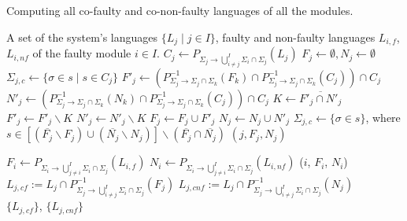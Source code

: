 \documentclass[a4paper, 10pt, conference]{ieeeconf}
\begin{document}
\begin{algorithm} Computing all co-faulty and co-non-faulty languages of
all the modules.
\label{alg:full_co_faulty}
\begin{algorithmic}[1]
	\Require A set of the system's languages $\{L_j\mid j \in I\}$, faulty and
	non-faulty languages $L_{i,f}$, $L_{i,nf}$ of the faulty module $i\in I$.
	\label{alg:fcf_init}
		\State $C_j \leftarrow 
			P_{\Sigma_j \rightarrow \bigcup_{i\neq j}^I \Sigma_i\cap \Sigma_j}(L_j)$
		\State $F_j \leftarrow \emptyset, N_j \leftarrow \emptyset$
		\State $\Sigma_{j,c} \leftarrow \{\sigma \in s \mid s \in C_j\}$
	\EndFor
			\State $F'_j \leftarrow (
			P_{\Sigma_j \rightarrow \Sigma_j \cap \Sigma_k}^{-1}(F_k)
			\cap 
			P_{\Sigma_j \rightarrow \Sigma_j \cap \Sigma_k}^{-1}(C_j) 
			)\cap C_j$
			\label{alg:fcf_partial_begin}
			\State $N'_j \leftarrow (
			P_{\Sigma_j \rightarrow \Sigma_j \cap \Sigma_k}^{-1}(N_k)
			\cap 
			P_{\Sigma_j \rightarrow \Sigma_j \cap \Sigma_k}^{-1}(C_j) 
			)\cap C_j$ 
			\State $K \leftarrow \overline{F'_j \cap N'_j}$
			\State $F'_j \leftarrow F'_j \backslash K$
			\State $N'_j \leftarrow N'_j \backslash K$
			\label{alg:fcf_partial_end}
				\label{alg:fcf_update}
				\State $F_j \leftarrow F_j \cup F'_j$
				\State $N_j \leftarrow N_j \cup N'_j$
				\State $\Sigma_{j,c} \leftarrow
					\{\sigma \in s \}$, where
				\State $s \in
						\left[(\overline{F_j} \backslash F_j) \cup
						(\overline{N_j} \backslash N_j)\right] \backslash	
						(\overline{F_j} \cap \overline{N_j})
						$
				\State {}$(j, F_j, N_j)$
			\EndIf
		\EndFor
	\EndProcedure
	
	\State $F_i \leftarrow 
		\label{alg:fcf_Fi}
		P_{\Sigma_i \rightarrow \bigcup_{j\neq i}^I \Sigma_i\cap \Sigma_j}(L_{i,f})$
	\State $N_i \leftarrow 
		P_{\Sigma_i \rightarrow \bigcup_{j\neq i}^I \Sigma_i\cap \Sigma_j}(L_{i,nf})$
	\State {}($i$, $F_i$, $N_i$)
		\label{alg:fcf_final}
		\State $L_{j,cf}:= L_j \cap 
		P_{\Sigma_j \rightarrow \bigcup_{i\neq j}^I \Sigma_i\cap \Sigma_j}^{-1}(F_j)$
		\State $L_{j,cnf}:= L_j \cap 
		P_{\Sigma_j \rightarrow \bigcup_{i\neq j}^I \Sigma_i\cap \Sigma_j}^{-1}(N_j)$
	\EndFor
	\\
	\Return $\{L_{j,cf}\}$, $\{L_{j,cnf}\}$
\end{algorithmic}
\end{algorithm}
\end{document}
